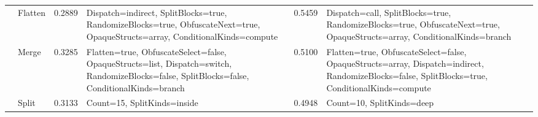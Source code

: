 \begin{table*}[p]
\begin{footnotesize}
\begin{tabular}{|p{1.5cm}|l|l|p{5cm}|l|p{5cm}|}
                                                                               & Flatten                                                                & 0.2889                                                    &  Dispatch=indirect, SplitBlocks=true, RandomizeBlocks=true, ObfuscateNext=true, OpaqueStructs=array, ConditionalKinds=compute                                                            & 0.5459                                                    &  Dispatch=call, SplitBlocks=true, RandomizeBlocks=true, ObfuscateNext=true, OpaqueStructs=array, ConditionalKinds=branch                                                                     \\ \cline{2-6} 
                                                                               & Merge                                                                  & 0.3285                                                    &  Flatten=true, ObfuscateSelect=false, OpaqueStructs=list, Dispatch=switch, RandomizeBlocks=false, SplitBlocks=false, ConditionalKinds=branch                                             & 0.5100                                                    &  Flatten=true, ObfuscateSelect=false, OpaqueStructs=array, Dispatch=indirect, RandomizeBlocks=false, SplitBlocks=true, ConditionalKinds=compute                                              \\ \cline{2-6} 
                                                                               & Split                                                                  & 0.3133                                                    &  Count=15, SplitKinds=inside                                                                                                                                                             & 0.4948                                                    &  Count=10, SplitKinds=deep                                                                                                                                                                   \\ \cline{2-6} 
                                                                              
\hline
\end{tabular}
\end{footnotesize}
\end{table*}